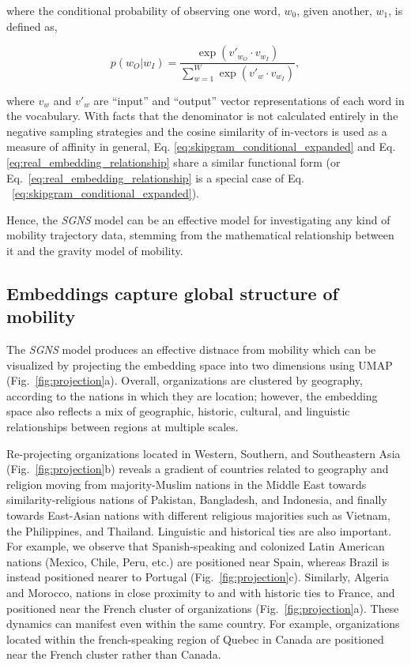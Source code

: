 \documentclass[12pt]{article} %
\def\SGNS{\textit{SGNS}}
\begin{document}
where the conditional probability of observing one word, $w_{0}$, given another, $w_{1}$, is defined as,

\begin{equation}
    \label{eq:skipgram_conditional_expanded}
    p(w_O|w_I) = \frac{\exp(v'_{w_O} \cdot v_{w_I})}{\sum_{w=1}^{W} \exp(v'_w \cdot v_{w_I})}, 
\end{equation}

where $v_w$ and $v'_w$ are ``input'' and ``output'' vector representations of each word in the vocabulary. With facts that the denominator is not calculated entirely in the negative sampling strategies and the cosine similarity of in-vectors is used as a measure of affinity in general, Eq. \ref{eq:skipgram_conditional_expanded} and Eq. \ref{eq:real_embedding_relationship} share a similar functional form (or Eq.~\ref{eq:real_embedding_relationship} is a special case of Eq. ~\ref{eq:skipgram_conditional_expanded}).

Hence, the \SGNS{} model can be an effective model for investigating any kind of mobility trajectory data, stemming from the mathematical relationship between it and the gravity model of mobility. 


%
%
\subsection*{Embeddings capture global structure of mobility}

The \SGNS{} model produces an effective distnace from mobility which can be visualized by projecting the embedding space into two dimensions using UMAP~\autocite{mcinnes2018umap} (Fig.~\ref{fig:projection}a).
Overall, organizations are clustered by geography, according to the nations in which they are location;
however, the embedding space also reflects a mix of geographic, historic, cultural, and linguistic relationships between regions at multiple scales.

Re-projecting organizations located in Western, Southern, and Southeastern Asia (Fig.~\ref{fig:projection}b) reveals a gradient of countries related to geography and religion moving from majority-Muslim nations in the Middle East towards similarity-religious nations of Pakistan, Bangladesh, and Indonesia, and finally towards East-Asian nations with different religious majorities such as Vietnam, the Philippines, and Thailand. 
Linguistic and historical ties are also important. 
For example, we observe that Spanish-speaking and colonized Latin American nations (Mexico, Chile, Peru, etc.) are positioned near Spain, whereas Brazil is instead positioned nearer to Portugal (Fig.~\ref{fig:projection}c). 
Similarly, Algeria and Morocco, nations in close proximity to and with historic ties to France, and positioned near the French cluster of organizations (Fig.~\ref{fig:projection}a). 
These dynamics can manifest even within the same country. 
For example, organizations located within the french-speaking region of Quebec in Canada are positioned near the French cluster rather than Canada.
\end{document}
